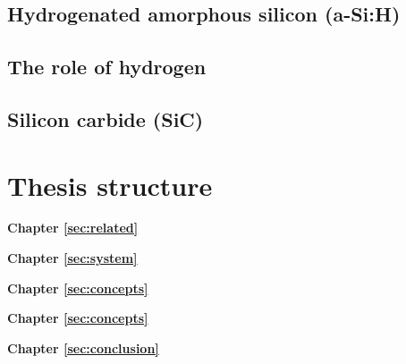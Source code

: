 \subsection{Hydrogenated amorphous silicon (a-Si:H)} 
\subsection{The role of hydrogen}
\subsection{Silicon carbide (SiC)}

\section{Thesis structure}
\label{sec:intro:structure}

\textbf{Chapter \ref{sec:related}} \\[0.2em]
\blindtext

\textbf{Chapter \ref{sec:system}} \\[0.2em]
\blindtext

\textbf{Chapter \ref{sec:concepts}} \\[0.2em]
\blindtext

\textbf{Chapter \ref{sec:concepts}} \\[0.2em]
\blindtext

\textbf{Chapter \ref{sec:conclusion}} \\[0.2em]
\blindtext
